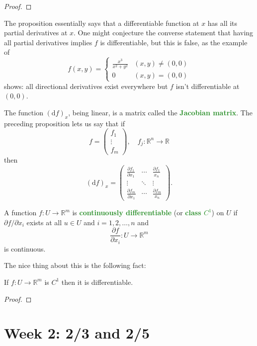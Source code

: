 \documentclass[10pt]{scrartcl}
\providecommand{\RR}{\mathbb R}
\providecommand{\vocab}[1]{{\textbf{\textcolor{ForestGreen}{#1}}}}
\begin{document}
\begin{proof}
\end{proof}

\begin{warning}
	The proposition essentially says that a differentiable function
	at $x$ has all its partial derivatives at $x$.
	One might conjecture the converse statement that
	having all partial derivatives implies $f$ is differentiable,
	but this is false, as the example of
	\[f(x,y) = \begin{cases}
		\frac{x^3}{x^2+y^2} & (x,y)\ne(0,0)\\
		0 & (x,y) = (0,0)
	\end{cases}\]
	shows: all directional derivatives exist everywhere
	but $f$ isn't differentiable at $(0,0)$.
\end{warning}

The function $(\mathrm df)_x$, being linear,
is a matrix called the \vocab{Jacobian matrix}.
The preceding proposition lets us say that if
\[f = \begin{pmatrix}
	f_1\\\vdots\\f_m
\end{pmatrix},\quad f_j\colon\RR^n\to\RR\]
then
\[(\mathrm df)_x = \begin{pmatrix}
	\frac{\partial f_1}{\partial x_1} &\cdots &\frac{\partial f_1}{x_n}\\
	\vdots & \ddots & \vdots\\
	\frac{\partial f_m}{\partial x_1} &\cdots &\frac{\partial f_m}{x_n}
\end{pmatrix}.\]

\begin{definition}
	A function $f\colon U\to\RR^m$ is
	\vocab{continuously differentiable} (or \vocab{class $C^1$})
	on $U$ if $\partial f/\partial x_i$ exists at all $u\in U$
	and $i = 1,2,\dots,n$ and
	\[\frac{\partial f}{\partial x_i}\colon U\to\RR^m\]
	is continuous.
\end{definition}

The nice thing about this is the following fact:

\begin{theorem}
	If $f\colon U\to\RR^m$ is $C^1$ then it is differentiable.
\end{theorem}

\begin{proof}
\end{proof}

\section{Week 2: 2/3 and 2/5}
\end{document}
